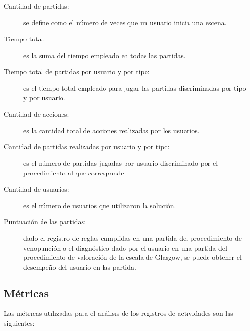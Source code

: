 \begin{description}

\item[Cantidad de partidas:] se define como el número de veces que un usuario
    inicia una escena. 

\item[Tiempo total:] es la suma del tiempo empleado en todas las partidas.

\item[Tiempo total de partidas por usuario y por tipo:] es el tiempo total 
    empleado para jugar las partidas discriminadas por tipo y por usuario.

\item[Cantidad de acciones:] es la cantidad total de acciones realizadas por 
    los usuarios.
 
\item[Cantidad de partidas realizadas por usuario y por tipo:] es el número de 
    partidas jugadas por usuario discriminado por el procedimiento al que 
    corresponde.

\item[Cantidad de usuarios:] es el número de usuarios que utilizaron la solución.
    
\item[Puntuación de las partidas:] dado el registro de reglas cumplidas en una partida 
    del procedimiento de venopunción o el diagnóstico dado por el usuario 
    en una partida del procedimiento de valoración de la escala de Glasgow, se 
    puede obtener el desempeño del usuario en las partida. 


\end{description}

\subsection{Métricas}

Las métricas utilizadas para el análisis de los registros de actividades son las siguientes:

